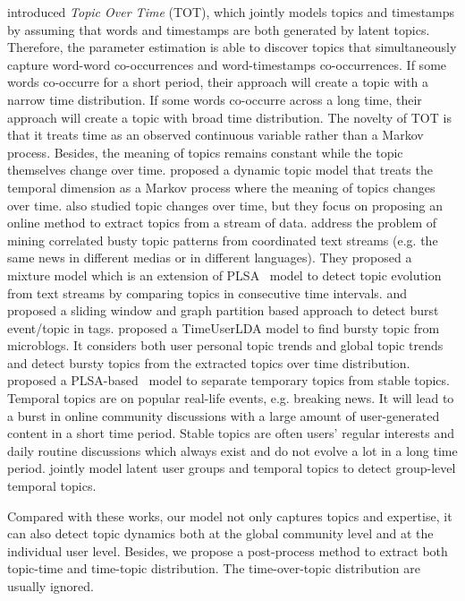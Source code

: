 \cite{wang2006topics} introduced \textit{Topic Over Time} (TOT), which jointly models topics and timestamps by assuming that words and timestamps are both generated by latent topics. Therefore, the parameter estimation is able to discover topics that simultaneously capture word-word co-occurrences and word-timestamps co-occurrences. If some words co-occurre for a short period, their approach will create a topic with a narrow time distribution. If some words co-occurre across a long time, their approach will create a topic with broad time distribution. The novelty of TOT  is that it treats time as an observed continuous variable rather than a Markov process. Besides, the meaning of topics remains constant while the topic themselves change over time. 
\cite{chp2blei2006dynamic} proposed a dynamic topic model that treats the temporal dimension as a Markov process where the meaning of topics changes over time. \cite{chp2onlineldaalsumait2008line} also studied topic changes over time, but they focus on proposing an online method to extract topics from a stream of data.
\cite{chp2wang2007mining} address the problem of mining correlated busty topic patterns from coordinated text streams (e.g. the same news in different medias or in different languages). They proposed a mixture model which is an extension of PLSA~\cite{hofmann1999probabilistic} model to detect topic evolution from text streams by comparing topics in consecutive time intervals. 
\cite{chp2yao2010detecting} and \cite{chp2yao2012bursty} proposed a sliding window and graph partition based approach to detect burst event/topic in tags. 
\cite{chp7diao2012finding} proposed a TimeUserLDA model to find bursty topic from microblogs. It considers both user personal topic trends and global topic trends and detect bursty topics from the extracted topics over time distribution.
\cite{yin2013unified}  proposed a PLSA-based~\cite{hofmann1999probabilistic} model to separate temporary topics from stable topics. Temporal topics are on popular real-life events, e.g. breaking news. It will lead to a burst in online community discussions with a large amount of user-generated content in a short time period. Stable topics are often users' regular interests and daily routine discussions which always exist and do not evolve a lot in a long time period. \cite{hu2014user} jointly model latent user groups and temporal topics to detect group-level temporal topics.

Compared with these works, our model not only captures topics and expertise, it  can also detect topic dynamics both at the global community level and at the individual user level. Besides, we propose a post-process method to extract both topic-time and time-topic distribution. The time-over-topic distribution are usually ignored.


